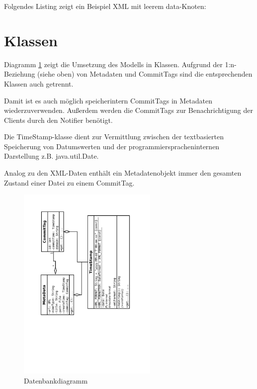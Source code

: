 Folgendes Listing zeigt ein Beispiel XML mit leerem data-Knoten:


\section{Klassen}
Diagramm \ref{design:dia:data:db} zeigt die Umsetzung des Modells in Klassen.
Aufgrund der 1:n-Beziehung (siehe oben) von Metadaten und CommitTags sind die entsprechenden
Klassen auch getrennt. 

Damit ist es auch möglich speicherintern CommitTags in Metadaten wiederzuverwenden.
Außerdem werden die CommitTags zur Benachrichtigung der Clients durch den Notifier benötigt.


Die TimeStamp-klasse dient zur Vermittlung zwischen der textbasierten Speicherung von Datumswerten und der
programmierspracheninternen Darstellung z.B. java.util.Date.

Analog zu den XML-Daten enthält ein Metadatenobjekt immer den gesamten Zustand einer Datei zu einem CommitTag.

\begin{figure}[h]
	\centering
	\label{design:dia:data:db}
	\includegraphics[width=0.6\textwidth, angle=270]{design/data/model.pdf}
	\caption{Datenbankdiagramm}
\end{figure}

